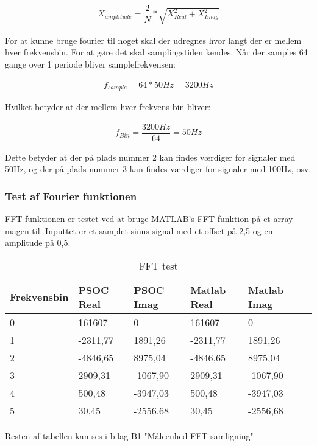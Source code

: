 \begin{align}
X_{amplitude} = \dfrac{2}{N}*\sqrt{X_{Real}^{2}+X_{Imag}^{2}}
\end{align} 	  


For at kunne bruge fourier til noget skal der udregnes hvor langt der er mellem hver frekvensbin. For at gøre det skal samplingstiden kendes. Når der samples 64 gange over 1 periode bliver samplefrekvensen:

\begin{align}
f_{sample} = 64 * 50Hz = 3200Hz
\end{align}   

Hvilket betyder at der mellem hver frekvens bin bliver:

\begin{align}
f_{Bin} = \dfrac{3200Hz}{64} = 50Hz
\end{align}

Dette betyder at der på plads nummer 2 kan findes værdiger for signaler med 50Hz, og der på plads nummer 3 kan findes værdiger for signaler med 100Hz, osv.

\subsubsection{Test af Fourier funktionen}
FFT funktionen er testet ved at bruge MATLAB's FFT funktion på et array magen til. Inputtet er et samplet sinus signal med et offset på 2,5 og en amplitude på 0,5.

\begin{table}[H] 
	\centering 
	\begin{tabular}{|l|l|l|l|l|l|} %
		\hline 	%
		Frekvensbin &PSOC Real				& PSOC Imag 	&Matlab Real    	&Matlab Imag 	 \\ \hline 	
		0&161607		&0				&161607		&0 	 \\ \hline 
		1&-2311,77	&1891,26		&-2311,77	&1891,26	 \\ \hline
		2&-4846,65	&8975,04		&-4846,65	&8975,04	 \\ \hline
		3&2909,31 	&-1067,90		&2909,31 	&-1067,90	 \\ \hline 
		4&500,48 		&-3947,03		&500,48 	&-3947,03	 \\ \hline 
		5&30,45		&-2556,68		&30,45		&-2556,68 \\ \hline   
	\end{tabular} 
	\caption{FFT test} 
	\label{tab:fftTest} 
\end{table}
Resten af tabellen kan ses i bilag B1 "Måleenhed FFT samligning" 

